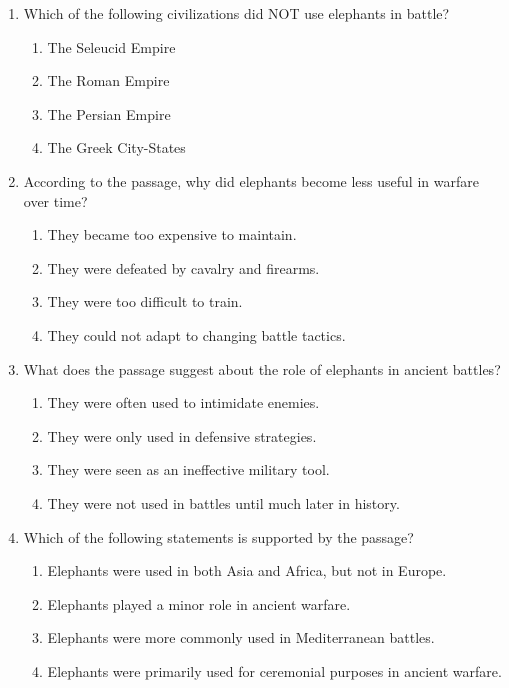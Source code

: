 \documentclass[12pt]{article}
\begin{document}
\begin{enumerate}
    \item Which of the following civilizations did NOT use elephants in battle?
    \begin{enumerate}[label=\Alph*.]
        \item The Seleucid Empire
        \item The Roman Empire
        \item The Persian Empire
        \item The Greek City-States
    \end{enumerate}
    \vspace{0.5cm}

    \item According to the passage, why did elephants become less useful in warfare over time?
    \begin{enumerate}[label=\Alph*.]
        \item They became too expensive to maintain.
        \item They were defeated by cavalry and firearms.
        \item They were too difficult to train.
        \item They could not adapt to changing battle tactics.
    \end{enumerate}
    \vspace{0.5cm}

    \item What does the passage suggest about the role of elephants in ancient battles?
    \begin{enumerate}[label=\Alph*.]
        \item They were often used to intimidate enemies.
        \item They were only used in defensive strategies.
        \item They were seen as an ineffective military tool.
        \item They were not used in battles until much later in history.
    \end{enumerate}
    \vspace{0.5cm}

    \item Which of the following statements is supported by the passage?
    \begin{enumerate}[label=\Alph*.]
        \item Elephants were used in both Asia and Africa, but not in Europe.
        \item Elephants played a minor role in ancient warfare.
        \item Elephants were more commonly used in Mediterranean battles.
        \item Elephants were primarily used for ceremonial purposes in ancient warfare.
    \end{enumerate}
    \vspace{0.5cm}


\end{enumerate}
\end{document}
